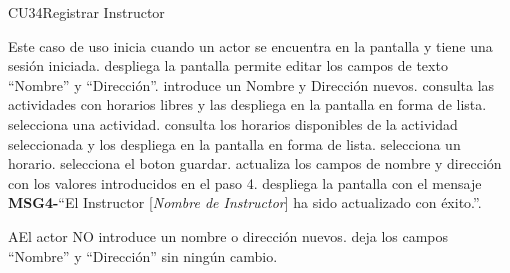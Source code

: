 \begin{UseCase}{CU34}{Registrar Instructor}
{\begin{UCtrayectoria}{Este caso de uso inicia cuando un actor se encuentra en la pantalla  y tiene una sesión iniciada.}
		\UCpaso despliega la pantalla 
		\UCpaso permite editar los campos de texto “Nombre” y “Dirección”.
		\UCpaso[\UCactor] introduce un Nombre y Dirección nuevos.
		\UCpaso consulta las actividades con horarios libres y las despliega en la pantalla en forma de lista.
		\UCpaso[\UCactor] selecciona una actividad.
		\UCpaso consulta los horarios disponibles de la actividad seleccionada y los despliega en la pantalla en forma de lista.
		\UCpaso[\UCactor] selecciona un horario.
		\UCpaso[\UCactor] selecciona el boton guardar.
		\UCpaso actualiza los campos de nombre y dirección con los valores introducidos en el paso 4.
		\UCpaso {}
		\UCpaso despliega la pantalla  con el mensaje {\bf MSG4-}``El Instructor [{\em Nombre de Instructor}] ha sido actualizado con éxito.''.
	\end{UCtrayectoria}

		\begin{UCtrayectoriaA}{A}{El actor NO introduce un nombre o dirección nuevos.}
			\UCpaso deja los campos “Nombre” y “Dirección” sin ningún cambio.
		\end{UCtrayectoriaA}
		
}
\end{UseCase}

